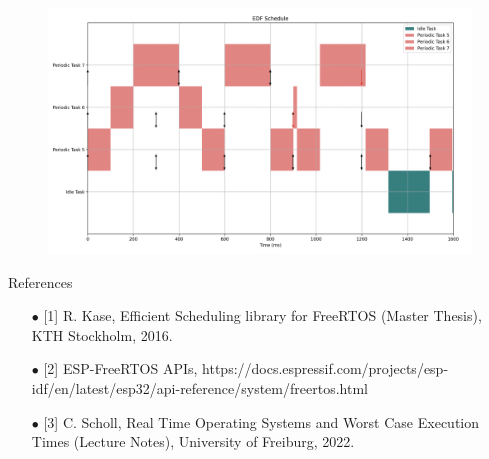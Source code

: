 \documentclass[10pt]{beamer}
\begin{document}
\begin{frame}
\begin{figure}
	\centerline{\includegraphics[scale = 0.25]{figures/Ex10_3P_DL.png}}
	\label{Fig10}
\end{figure}
\end{frame}


\begin{frame}{\small{References}}
	\footnotesize{
		\begin{itemize}
			\item[$\bullet$] [1] R. Kase, Efficient Scheduling library for FreeRTOS (Master Thesis), KTH Stockholm, 2016.\\
			\item[$\bullet$] [2] ESP-FreeRTOS APIs, https://docs.espressif.com/projects/esp-idf/en/latest/esp32/api-reference/system/freertos.html\\
			\item[$\bullet$] [3] C. Scholl, Real Time Operating Systems and Worst Case Execution Times (Lecture Notes), University of Freiburg, 2022.\\
			
		\end{itemize}
	}
\end{frame}



\end{document}
